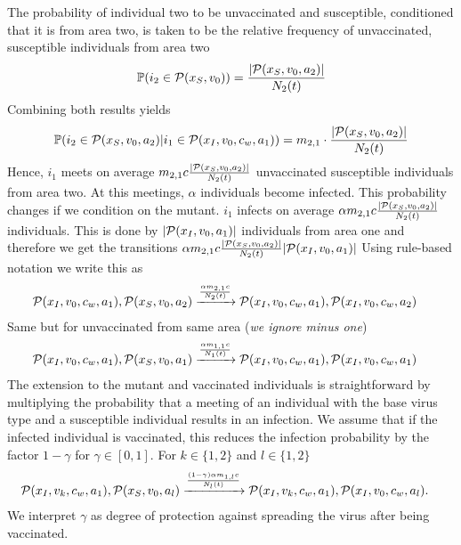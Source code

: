 The probability of individual two to be unvaccinated and susceptible, conditioned that it is from area two, is taken to be the relative frequency of unvaccinated, susceptible individuals from area two
\begin{align*}
\mathbb{P}(i_2 \in \mathcal{P}(x_S, v_0)) = \frac{|\mathcal{P}(x_S, v_0, a_2)|}{N_2(t)}
\end{align*}
Combining both results yields
\begin{align*}
\mathbb{P}(i_2 \in \mathcal{P}(x_S, v_0 ,a_2)|i_1 \in \mathcal{P}(x_I, v_0,c_w, a_1)) = m_{2,1} \cdot \frac{|\mathcal{P}(x_S, v_0, a_2)|}{N_2(t)}
\end{align*}
Hence, $i_1$ meets on average $m_{2,1} c \frac{|\mathcal{P}(x_S, v_0, a_2)|}{N_2(t)}$ unvaccinated susceptible individuals from area two. At this meetings, $\alpha$ individuals become infected. This probability changes if we condition on the mutant. $i_1$ infects on average $\alpha m_{2,1} c \frac{|\mathcal{P}(x_S, v_0, a_2)|}{N_2(t)} $ individuals. This is done by $|\mathcal{P}(x_I, v_0, a_1)|$ individuals from area one and therefore we get the transitions $\alpha  m_{2,1} c \frac{|\mathcal{P}(x_S, v_0, a_2)|}{N_2(t)} |\mathcal{P}(x_I, v_0, a_1)|$
Using rule-based notation we write this as 
\begin{align*}
\mathcal{P}(x_{I},  v_0, c_w,a_1), \mathcal{P}(x_{S}, v_0, a_2) &\xrightarrow{ \frac{\alpha  m_{2,1} c}{N_2(t)} } \mathcal{P}(x_{I},v_0, c_w,a_1), \mathcal{P}(x_{I}, v_0, c_w, a_2)
\end{align*}
Same but for unvaccinated from same area (\textit{we ignore minus one})
\begin{align*}
\mathcal{P}(x_{I},  v_0, c_w,a_1), \mathcal{P}(x_{S}, v_0, a_1) &\xrightarrow{\frac{\alpha  m_{1,1} c}{N_1(t)}} \mathcal{P}(x_{I},  v_0, c_w,a_1), \mathcal{P}(x_{I},  v_0, c_w,a_1)
\end{align*}
The extension to the mutant and vaccinated individuals is straightforward by multiplying the probability that a meeting of an individual with the base virus type and a susceptible individual results in an infection. We assume that if the infected individual is vaccinated, this reduces the infection probability by the factor $1 -\gamma$ for $\gamma \in [0,1]$. For $k \in \{1,2\}$ and $l \in \{1,2\}$
\begin{align*}
\mathcal{P}(x_{I},  v_k, c_w, a_1), \mathcal{P}(x_{S}, v_0, a_l) &\xrightarrow{\frac{(1-\gamma) \alpha  m_{1,l} c}{N_l(t)}} \mathcal{P}(x_{I},  v_k, c_w,a_1), \mathcal{P}(x_{I},  v_0, c_w,a_l).
\end{align*}
We interpret $\gamma$ as degree of protection against spreading the virus after being vaccinated.

